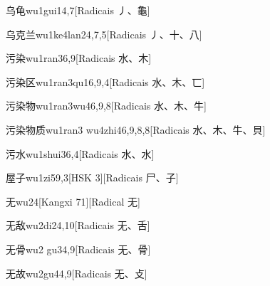 \begin{entry}{乌龟}{wu1gui1}{4,7}[Radicais ⼃、⿔]
\end{entry}

\begin{entry}{乌克兰}{wu1ke4lan2}{4,7,5}[Radicais ⼃、⼗、⼋]
\end{entry}

\begin{entry}{污染}{wu1ran3}{6,9}[Radicais ⽔、⽊]
\end{entry}

\begin{entry}{污染区}{wu1ran3qu1}{6,9,4}[Radicais ⽔、⽊、⼖]
\end{entry}

\begin{entry}{污染物}{wu1ran3wu4}{6,9,8}[Radicais ⽔、⽊、⽜]
\end{entry}

\begin{entry}{污染物质}{wu1ran3 wu4zhi4}{6,9,8,8}[Radicais ⽔、⽊、⽜、⾙]
\end{entry}

\begin{entry}{污水}{wu1shui3}{6,4}[Radicais ⽔、⽔]
\end{entry}

\begin{entry}{屋子}{wu1zi5}{9,3}[HSK 3][Radicais ⼫、⼦]
\end{entry}

\begin{entry}{无}{wu2}{4}[Kangxi 71][Radical ⽆]
\end{entry}

\begin{entry}{无敌}{wu2di2}{4,10}[Radicais ⽆、⾆]
\end{entry}

\begin{entry}{无骨}{wu2 gu3}{4,9}[Radicais ⽆、⾻]
\end{entry}

\begin{entry}{无故}{wu2gu4}{4,9}[Radicais ⽆、⽁]
\end{entry}

